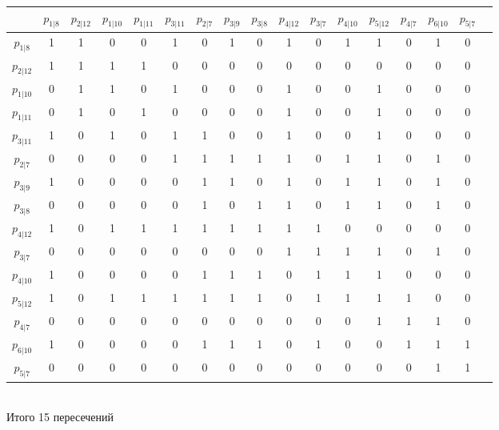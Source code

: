 \documentclass[12pt,a4paper]{report}
\begin{document}
\begin{tabular}{|c|c|c|c|c|c|c|c|c|c|c|c|c|c|c|c|c|}
    \hline
    & $p_{1 | 8}$ & $p_{2 | 12}$ & $p_{1 | 10}$ & $p_{1 | 11}$ & $p_{3 | 11}$ & $p_{2 | 7}$ & $p_{3 | 9}$ & $p_{3 | 8}$ & $p_{4 | 12}$ & $p_{3 | 7}$ & $p_{4 | 10}$ & $p_{5 | 12}$ & $p_{4 | 7}$ & $p_{6 | 10}$ & $p_{5 | 7}$ \\
    \hline
    $p_{1 | 8}$ & 1 & 1 & 0 & 0 & 1 & 0 & 1 & 0 & 1 & 0 & 1 & 1 & 0 & 1 & 0 \\
    \hline
    $p_{2 | 12}$ & 1 & 1 & 1 & 1 & 0 & 0 & 0 & 0 & 0 & 0 & 0 & 0 & 0 & 0 & 0 \\
    \hline
    $p_{1 | 10}$ & 0 & 1 & 1 & 0 & 1 & 0 & 0 & 0 & 1 & 0 & 0 & 1 & 0 & 0 & 0 \\
    \hline
    $p_{1 | 11}$ & 0 & 1 & 0 & 1 & 0 & 0 & 0 & 0 & 1 & 0 & 0 & 1 & 0 & 0 & 0 \\
    \hline
    $p_{3 | 11}$ & 1 & 0 & 1 & 0 & 1 & 1 & 0 & 0 & 1 & 0 & 0 & 1 & 0 & 0 & 0 \\
    \hline
    $p_{2 | 7}$ & 0 & 0 & 0 & 0 & 1 & 1 & 1 & 1 & 1 & 0 & 1 & 1 & 0 & 1 & 0 \\
    \hline
    $p_{3 | 9}$ & 1 & 0 & 0 & 0 & 0 & 1 & 1 & 0 & 1 & 0 & 1 & 1 & 0 & 1 & 0 \\
    \hline
    $p_{3 | 8}$ & 0 & 0 & 0 & 0 & 0 & 1 & 0 & 1 & 1 & 0 & 1 & 1 & 0 & 1 & 0 \\
    \hline
    $p_{4 | 12}$ & 1 & 0 & 1 & 1 & 1 & 1 & 1 & 1 & 1 & 1 & 0 & 0 & 0 & 0 & 0 \\
    \hline
    $p_{3 | 7}$ & 0 & 0 & 0 & 0 & 0 & 0 & 0 & 0 & 1 & 1 & 1 & 1 & 0 & 1 & 0 \\
    \hline
    $p_{4 | 10}$ & 1 & 0 & 0 & 0 & 0 & 1 & 1 & 1 & 0 & 1 & 1 & 1 & 0 & 0 & 0 \\
    \hline
    $p_{5 | 12}$ & 1 & 0 & 1 & 1 & 1 & 1 & 1 & 1 & 0 & 1 & 1 & 1 & 1 & 0 & 0 \\
    \hline
    $p_{4 | 7}$ & 0 & 0 & 0 & 0 & 0 & 0 & 0 & 0 & 0 & 0 & 0 & 1 & 1 & 1 & 0 \\
    \hline
    $p_{6 | 10}$ & 1 & 0 & 0 & 0 & 0 & 1 & 1 & 1 & 0 & 1 & 0 & 0 & 1 & 1 & 1 \\
    \hline
    $p_{5 | 7}$ & 0 & 0 & 0 & 0 & 0 & 0 & 0 & 0 & 0 & 0 & 0 & 0 & 0 & 1 & 1 \\
    \hline
\end{tabular}\\
\hfill\break
\normalsize
Итого 15 пересечений
\end{document}
